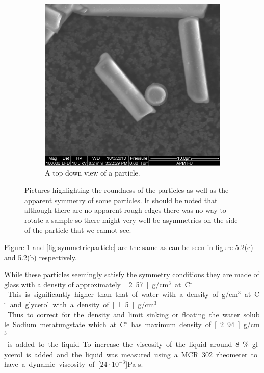 \begin{figure}[H]
\begin{subfigure}[3b]{0.40\textwidth}
\includegraphics[width=\textwidth]{figures/method/round.png}
\caption{A top down view of a particle.}\label{fig:roundparticle}
\end{subfigure}
\caption{Pictures highlighting the roundness of the particles as well as the apparent symmetry of some particles. It should be noted that although there are no apparent rough edges there was no way to rotate a sample so there might very well be asymmetries on the side of the particle that we cannot see.}
\label{fig:particlepictures2}
\end{figure}

Figure \ref{fig:roundparticle} and \ref{fig:symmetricparticle} are the same as can be seen in \cite{alexanderThesis} figure 5.2(c) and 5.2(b) respectively. 

While these particles seemingly satisfy the symmetry conditions they are made of glass with a density of approximately 
\unit[2.57]{g/cm$^3$} at \unit[20]{C$^\circ$}. This is significantly higher than that of water with a density of 
\unit[1]{g/cm$^3$} at \unit[20]{C$^\circ$} and glycerol with a density of \unit[1.5]{g/cm$^3$}. Thus to correct for the 
density and limit sinking or floating the water soluble Sodium metatungstate which at \unit[20]{C$^\circ$} has maximum 
density of \unit[2.94]{g/cm$^3$} is added to the liquid. To increase the viscosity of the liquid around 8\% glycerol is added and the liquid 
was measured using a MCR 302 rheometer to have a dynamic viscosity of \unit[$24\cdot 10^{-3}$]{Pa s}.
